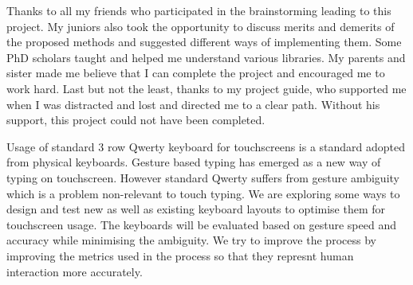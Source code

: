 \documentclass[MTech]{iitmdiss}
\begin{document}
Thanks to all my friends who participated in the brainstorming leading to this project. My juniors also took the opportunity to discuss merits and demerits of the proposed methods and suggested different ways of implementing them. Some PhD scholars taught and helped me understand various libraries. My parents and sister made me believe that I can complete the project and encouraged me to work hard. Last but not the least, thanks to my project guide, who supported me when I was distracted and lost and directed me to a clear path. Without his support, this project could not have been completed.


\abstract


\noindent Usage of standard 3 row Qwerty keyboard for touchscreens is a standard adopted from physical keyboards. Gesture based typing has emerged as a new way of typing on touchscreen. However standard Qwerty suffers from gesture ambiguity which is a problem non-relevant to touch typing. We are exploring some ways to design and test new as well as existing keyboard layouts to optimise them for touchscreen usage. The keyboards will be evaluated based on gesture speed and accuracy while minimising the ambiguity. We try to improve the process by improving the metrics used in the process so that they represnt human interaction more accurately.

\pagebreak


\begin{singlespace}
\tableofcontents
\thispagestyle{empty}

\listoffigures
{}
\end{singlespace}



\end{document}
